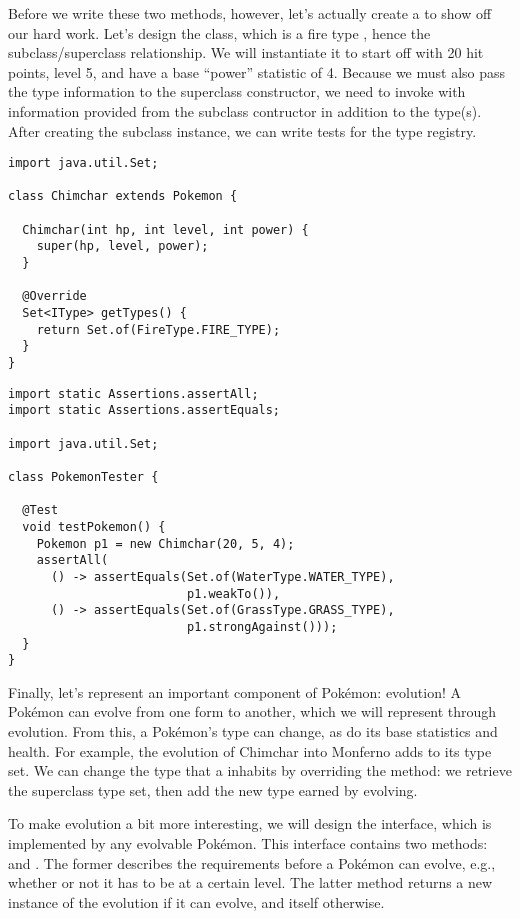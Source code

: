 Before we write these two methods, however, let's actually create a  to show off our hard work. Let's design the  class, which is a fire type , hence the subclass/superclass relationship. We will instantiate it to start off with 20 hit points, level 5, and have a base ``power'' statistic of 4. Because we must also pass the type information to the superclass constructor, we need to invoke  with information provided from the subclass contructor in addition to the type(s). After creating the subclass instance, we can write tests for the type registry. 

\begin{lstlisting}[language=MyJava]
import java.util.Set;

class Chimchar extends Pokemon {

  Chimchar(int hp, int level, int power) {
    super(hp, level, power);
  }

  @Override
  Set<IType> getTypes() {
    return Set.of(FireType.FIRE_TYPE);
  }
}
\end{lstlisting}

\begin{lstlisting}[language=MyJava]
import static Assertions.assertAll;
import static Assertions.assertEquals;

import java.util.Set;

class PokemonTester {

  @Test
  void testPokemon() {
    Pokemon p1 = new Chimchar(20, 5, 4);
    assertAll(
      () -> assertEquals(Set.of(WaterType.WATER_TYPE),
                         p1.weakTo()),
      () -> assertEquals(Set.of(GrassType.GRASS_TYPE),
                         p1.strongAgainst()));
  }
}
\end{lstlisting}

Finally, let's represent an important component of Pok\'emon: evolution! A Pok\'emon can evolve from one form to another, which we will represent through evolution. From this, a Pok\'emon's type can change, as do its base statistics and health. For example, the evolution of Chimchar into Monferno adds  to its type set. We can change the type that a  inhabits by overriding the  method: we retrieve the superclass type set, then add the new type earned by evolving.

To make evolution a bit more interesting, we will design the  interface, which is implemented by any evolvable Pok\'emon. This interface contains two methods:  and . The former describes the requirements before a Pok\'emon can evolve, e.g., whether or not it has to be at a certain level. The latter  method returns a new instance of the evolution if it can evolve, and itself otherwise. 

